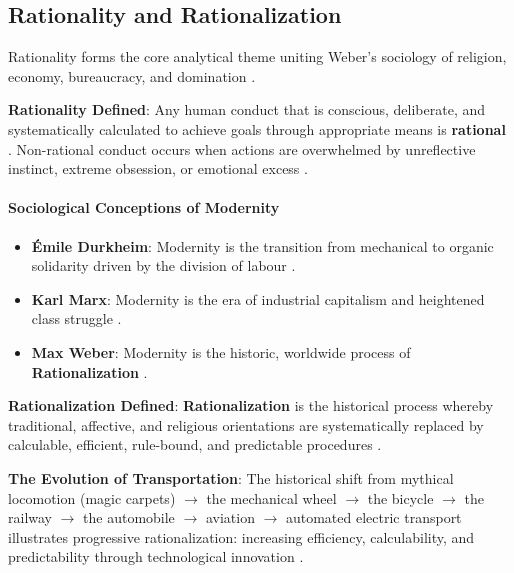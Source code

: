 \subsection{Rationality and Rationalization}

Rationality forms the core analytical theme uniting Weber's sociology of religion, economy, bureaucracy, and domination .

\begin{KeyConcept}
\textbf{Rationality Defined}: Any human conduct that is conscious, deliberate, and systematically calculated to achieve goals through appropriate means is \textbf{rational} . Non-rational conduct occurs when actions are overwhelmed by unreflective instinct, extreme obsession, or emotional excess .
\end{KeyConcept}

\paragraph{Sociological Conceptions of Modernity}
\begin{itemize}
    \item \textbf{\'Emile Durkheim}: Modernity is the transition from mechanical to organic solidarity driven by the division of labour .
    \item \textbf{Karl Marx}: Modernity is the era of industrial capitalism and heightened class struggle .
    \item \textbf{Max Weber}: Modernity is the historic, worldwide process of \textbf{Rationalization} .
\end{itemize}

\begin{KeyConcept}
\textbf{Rationalization Defined}: \textbf{Rationalization} is the historical process whereby traditional, affective, and religious orientations are systematically replaced by calculable, efficient, rule-bound, and predictable procedures .
\end{KeyConcept}

\begin{ExampleBox}
\textbf{The Evolution of Transportation}:
The historical shift from mythical locomotion (magic carpets) $\rightarrow$ the mechanical wheel $\rightarrow$ the bicycle $\rightarrow$ the railway $\rightarrow$ the automobile $\rightarrow$ aviation $\rightarrow$ automated electric transport illustrates progressive rationalization: increasing efficiency, calculability, and predictability through technological innovation .
\end{ExampleBox}

